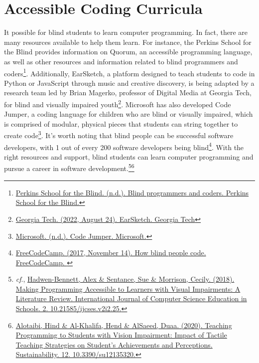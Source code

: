\pagebreak\hypertarget{appx8}{}\section[Accessible Coding Curricula]{Accessible Coding Curricula}\label{appx8}
It possible for blind students to learn computer programming. In fact, there are many resources available to help them learn. For instance, the Perkins School for the Blind provides information on Quorum, an accessible programming language, as well as other resources and information related to blind programmers and coders\footnote{\raggedright \href{https://www.perkins.org/stories/blind-programmers-and-coders}{Perkins School for the Blind. (n.d.). Blind programmers and coders. Perkins School for the Blind.}}. Additionally, EarSketch, a platform designed to teach students to code in Python or JavaScript through music and creative discovery, is being adapted by a research team led by Brian Magerko, professor of Digital Media at Georgia Tech, for blind and visually impaired youth\footnote{\raggedright \href{https://earsketch.gatech.edu/}{Georgia Tech. (2022, August 24). EarSketch. Georgia Tech}}. Microsoft has also developed Code Jumper, a coding language for children who are blind or visually impaired, which is comprised of modular, physical pieces that students can string together to create code\footnote{\raggedright \href{https://www.microsoft.com/en-us/research/project/code-jumper/}{Microsoft. (n.d.). Code Jumper. Microsoft.} }. It’s worth noting that blind people can be successful software developers, with 1 out of every 200 software developers being blind\footnote{\raggedright \href{https://www.freecodecamp.org/news/how-blind-people-code-fdb64e3bf5c/}{FreeCodeCamp. (2017, November 14). How blind people code. FreeCodeCamp. }}. With the right resources and support, blind students can learn computer programming and pursue a career in software development.\footnote{\raggedright \textit{cf}., \href{https://files.eric.ed.gov/fulltext/EJ1207407.pdf}{Hadwen-Bennett, Alex \& Sentance, Sue \& Morrison, Cecily. (2018). Making Programming Accessible to Learners with Visual Impairments: A Literature Review. International Journal of Computer Science Education in Schools. 2. 10.21585/ijcses.v2i2.25.}}\fnsep\footnote{\raggedright \href{https://www.mdpi.com/2071-1050/12/13/5320}{Alotaibi, Hind \& Al-Khalifa, Hend \& AlSaeed, Duaa. (2020). Teaching Programming to Students with Vision Impairment: Impact of Tactile Teaching Strategies on Student’s Achievements and Perceptions. Sustainability. 12. 10.3390/su12135320.}}

